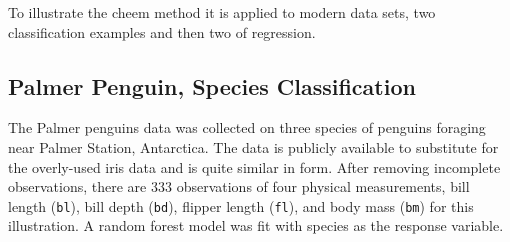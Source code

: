 \documentclass[
]{jss}
\begin{document}
To illustrate the cheem method it is applied to modern data sets, two
classification examples and then two of regression.

\hypertarget{palmer-penguin-species-classification}{%
\subsection{Palmer Penguin, Species
Classification}\label{palmer-penguin-species-classification}}

The Palmer penguins data
\citep{gorman_ecological_2014, horst_palmerpenguins_2020} was collected
on three species of penguins foraging near Palmer Station, Antarctica.
The data is publicly available to substitute for the overly-used iris
data and is quite similar in form. After removing incomplete
observations, there are 333 observations of four physical measurements,
bill length (\texttt{bl}), bill depth (\texttt{bd}), flipper length
(\texttt{fl}), and body mass (\texttt{bm}) for this illustration. A
random forest model was fit with species as the response variable.
\end{document}
